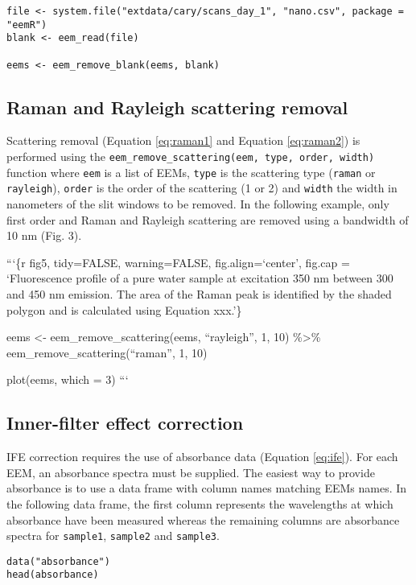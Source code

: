\documentclass[]{book}
\theoremstyle{definition}
\theoremstyle{definition}
\theoremstyle{remark}
\begin{document}
\begin{verbatim}
file <- system.file("extdata/cary/scans_day_1", "nano.csv", package = "eemR")
blank <- eem_read(file)

eems <- eem_remove_blank(eems, blank)
\end{verbatim}

\subsection{Raman and Rayleigh scattering
removal}\label{raman-and-rayleigh-scattering-removal}

Scattering removal (Equation \eqref{eq:raman1} and Equation
\eqref{eq:raman2}) is performed using the
\texttt{eem\_remove\_scattering(eem,\ type,\ order,\ width)} function
where \texttt{eem} is a list of EEMs, \texttt{type} is the scattering
type (\texttt{raman} or \texttt{rayleigh}), \texttt{order} is the order
of the scattering (1 or 2) and \texttt{width} the width in nanometers of
the slit windows to be removed. In the following example, only first
order and Raman and Rayleigh scattering are removed using a bandwidth of
10 nm (Fig. 3).

```\{r fig5, tidy=FALSE, warning=FALSE, fig.align=`center', fig.cap =
`Fluorescence profile of a pure water sample at excitation 350 nm
between 300 and 450 nm emission. The area of the Raman peak is
identified by the shaded polygon and is calculated using Equation
xxx.'\}

eems \textless{}- eem\_remove\_scattering(eems, ``rayleigh'', 1, 10)
\%\textgreater{}\% eem\_remove\_scattering(``raman'', 1, 10)

plot(eems, which = 3) ```

\subsection{Inner-filter effect
correction}\label{inner-filter-effect-correction-1}

IFE correction requires the use of absorbance data (Equation
\eqref{eq:ife}). For each EEM, an absorbance spectra must be supplied. The
easiest way to provide absorbance is to use a data frame with column
names matching EEMs names. In the following data frame, the first column
represents the wavelengths at which absorbance have been measured
whereas the remaining columns are absorbance spectra for
\texttt{sample1}, \texttt{sample2} and \texttt{sample3}.

\begin{verbatim}
data("absorbance")
head(absorbance)
\end{verbatim}
\end{document}
